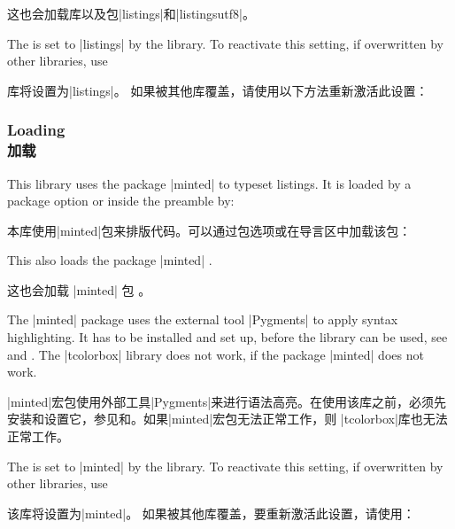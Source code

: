 这也会加载库以及包|listings|\cite{hoffmann:listings}和|listingsutf8|\cite{oberdiek:listingsutf8}。

The  is set to |listings| by the library.
To reactivate this setting, if overwritten by other libraries, use

库将设置为|listings|。 如果被其他库覆盖，请使用以下方法重新激活此设置：
\begin{dispListing}
\end{dispListing}


\subsubsection{Loading \\加载}
This library uses the package |minted| \cite{poore:minted} to typeset
listings. It is loaded by a package option or inside the preamble by:

本库使用|minted|\cite{poore:minted}包来排版代码。可以通过包选项或在导言区中加载该包：
\begin{dispListing}
\end{dispListing}
This also loads the package |minted| \cite{poore:minted}.

这也会加载 |minted| 包 \cite{poore:minted}。
\begin{marker}
The |minted| package uses the external tool |Pygments| \cite{pygments:web}
to apply syntax highlighting. It has to be installed and set up, before the
library can be used, see \cite{poore:minted} and \cite{pygments:web}.
The |tcolorbox| library  does not work, if the package
|minted| \cite{poore:minted} does not work.

|minted|宏包使用外部工具|Pygments|\cite{pygments:web}来进行语法高亮。在使用该库之前，必须先安装和设置它，参见\cite{poore:minted}和\cite{pygments:web}。如果|minted|\cite{poore:minted}宏包无法正常工作，则 |tcolorbox|库也无法正常工作。
\end{marker}

The  is set to |minted| by the library.
To reactivate this setting, if overwritten by other libraries, use

该库将设置为|minted|。 如果被其他库覆盖，要重新激活此设置，请使用：
\begin{dispListing}
\end{dispListing}